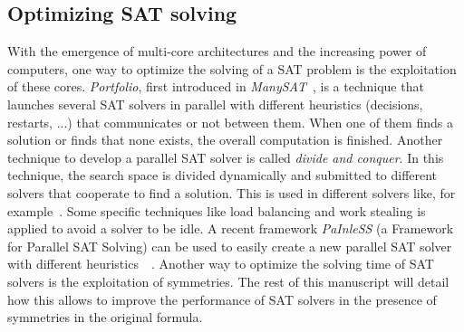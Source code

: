 \subsection{Optimizing SAT solving}
With the emergence of multi-core architectures and the increasing power of computers, one way to optimize the solving
of a SAT problem is the exploitation of these cores. %
\emph{Portfolio}, first introduced in \emph{ManySAT}~\cite{hamadi2008manysat}, is a technique that launches several SAT solvers in parallel with different heuristics (decisions, restarts, ...) that 
communicates or not between them. When one of them finds a solution or finds that none exists, the overall computation is finished.
Another technique to develop a parallel SAT solver is called \emph{divide and conquer}. In this technique,
the search space is divided  dynamically and submitted to different solvers that cooperate to find a solution.
This is used in different solvers like, for example~\cite{chu2008pminisat, lewis2007multithreaded}.
 Some specific techniques like load balancing and work stealing is applied to avoid a solver to be idle.
A recent framework \emph{PaInleSS} (a Framework for Parallel SAT Solving) can be used to easily create a new parallel 
SAT solver with different heuristics~\cite{le2017painless}~\cite{le2019modular}. 
Another way to optimize the solving time of SAT solvers is the exploitation of symmetries. The rest of this manuscript will 
detail how this allows to improve the performance of SAT solvers in the presence of symmetries in the original formula.
%
